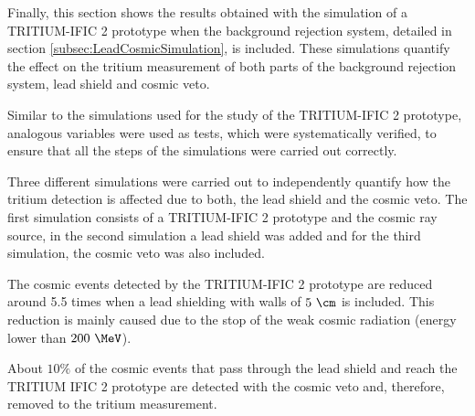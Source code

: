 Finally, this section shows the results obtained with the simulation of a TRITIUM-IFIC 2 prototype when the background rejection system, detailed in section \ref{subsec:LeadCosmicSimulation}, is included. These simulations quantify the effect on the tritium measurement of both parts of the background rejection system, lead shield and cosmic veto.

Similar to the simulations used for the study of the TRITIUM-IFIC 2 prototype, analogous variables were used as tests, which were systematically verified, to ensure that all the steps of the simulations were carried out correctly.

Three different simulations were carried out to independently quantify how the tritium detection is affected due to both, the lead shield and the cosmic veto. The first simulation consists of a TRITIUM-IFIC 2 prototype and the cosmic ray source, in the second simulation a lead shield was added and for the third simulation, the cosmic veto was also included.

The cosmic events detected by the TRITIUM-IFIC 2 prototype are reduced around 5.5 times when a lead shielding with walls of $5~\cm$ is included. This reduction is mainly caused due to the stop of the weak cosmic radiation (energy lower than $200~\MeV$).%

About $10\%$ of the cosmic events that pass through the lead shield and reach the TRITIUM IFIC 2 prototype are detected with the cosmic veto and, therefore, removed to the tritium measurement.